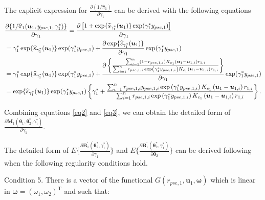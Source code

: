 \documentclass[12pt]{article}
\begin{document}
The explicit expression for $\frac{\partial ( 1/\widehat{\pi}_1)}{\partial \gamma_{1}}$ can be derived with the following equations
\begin{align}
    &\frac{\partial \{ 1/\widehat{\pi}_1(\bm{u}_1,y_{pse,1},\gamma_1^*)\}}{\partial \gamma_{1}} = \frac{\partial \left[1+\exp\{\widehat{s}_{\gamma_1^*}(\bm{u}_1)\}\exp(\gamma_1^*y_{pse,1})\right]}{\partial \gamma_1} \notag \\
    & = \gamma_1^*\exp\{\widehat{s}_{\gamma_1^*}(\bm{u}_1)\}\exp(\gamma_1^*y_{pse,1}) + \frac{\partial \exp\{\widehat{s}_{\gamma_1^*}(\bm{u}_1)\}}{\partial \gamma_1} \exp(\gamma_1^*y_{pse,1}) \notag \\
    & = \gamma_1^*\exp\{\widehat{s}_{\gamma_1^*}(\bm{u}_1)\}\exp(\gamma_1^*y_{pse,1}) + \frac{\partial \left\{\frac{\sum_{i=1}^{n} \left(1-r_{pse,1,i}\right)  K_{c_1}\left(\bm{u}_1-\bm{u}_{1,i}\right) r_{1,i} }{\sum_{i=1}^{n}  r_{pse,1,i}   \exp \left(\gamma_1^* y_{pse,1,i}\right) K_{c_1}\left(\bm{u}_1-\bm{u}_{1,i}\right) r_{1,i}} \right\}}{\partial \gamma_1} \exp(\gamma_1^*y_{pse,1}) \notag \\
    & =\exp\{\widehat{s}_{\gamma_1^*}(\bm{u}_1)\}\exp(\gamma_1^*y_{pse,1}) \left\{\gamma_1^*+ \frac{\sum_{i=1}^{n} r_{pse,1,i} y_{pse,1,i}  \exp \left(\gamma_1^* y_{pse,1,i}\right) K_{c_1}\left(\bm{u}_1-\bm{u}_{1,i}\right) r_{1,i} }{\sum_{i=1}^{n}  r_{pse,1,i}   \exp \left(\gamma_1^* y_{pse,1,i}\right) K_{c_1}\left(\bm{u}_1-\bm{u}_{1,i}\right) r_{1,i}}\right\}. \label{eq3}
\end{align}

Combining equations \eqref{eq2} and \eqref{eq3}, we can obtain the detailed form of $\frac{\partial \bm{M}_1(\bm{\theta}_1, \bm{\theta}_2^*,\gamma_1^*)}{\partial \gamma_1}$.



The detailed form of $E\{\frac{\partial \bm{B}_1^{\prime}(\bm{\theta}_2^*,\gamma_1^*)}{\partial \gamma_1}\}$ and $E\{\frac{\partial \bm{B}_1^{\prime}(\bm{\theta}_2^*,\gamma_1^*)}{\partial \bm{\theta}_2}\}$ can be derived following \cite{Shao_Wang_2016} when the following regularity conditions hold.


Condition 5. There is a vector of the functional $G(r_{pse,1}, \bm{u}_1, \bm{\omega})$ which is linear in $\bm{\omega}=\left(\omega_{1}, \omega_{2}\right)^{\mathrm{T}}$ and such that:
\end{document}
